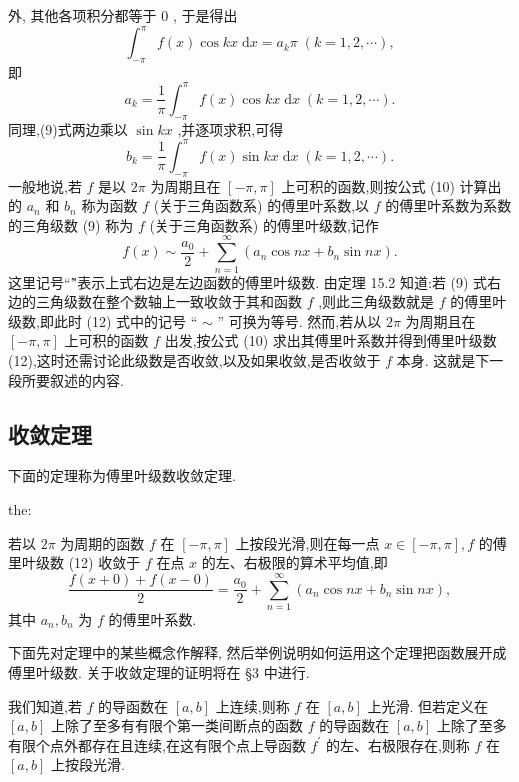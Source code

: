 外, 其他各项积分都等于 0 , 于是得出
\[
{\int }_{-\pi }^{\pi }f\left( x\right) \cos {kx}\mathrm{\;d}x = {a}_{k}\pi \;\left( {k = 1,2,\cdots }\right) ,
\]
即
\[
{a}_{k} = \frac{1}{\pi }{\int }_{-\pi }^{\pi }f\left( x\right) \cos {kx}\mathrm{\;d}x\;\left( {k = 1,2,\cdots }\right) .
\]
同理,(9)式两边乘以 \(\sin {kx}\) ,并逐项求积,可得
\[
{b}_{k} = \frac{1}{\pi }{\int }_{-\pi }^{\pi }f\left( x\right) \sin {kx}\mathrm{\;d}x\;\left( {k = 1,2,\cdots }\right) .
\]
一般地说,若 \(f\) 是以 \({2\pi }\) 为周期且在 \(\left\lbrack  {-\pi ,\pi }\right\rbrack\) 上可积的函数,则按公式 (10) 计算出的 \({a}_{n}\) 和 \({b}_{n}\) 称为函数 \(f\) (关于三角函数系) 的傅里叶系数,以 \(f\) 的傅里叶系数为系数的三角级数 (9) 称为 \(f\) (关于三角函数系) 的傅里叶级数,记作
\[
f\left( x\right)  \sim  \frac{{a}_{0}}{2} + \mathop{\sum }\limits_{{n = 1}}^{\infty }\left( {{a}_{n}\cos {nx} + {b}_{n}\sin {nx}}\right) . \tag{12}
\]
这里记号“\~”表示上式右边是左边函数的傅里叶级数. 由定理 15.2 知道:若 (9) 式右边的三角级数在整个数轴上一致收敛于其和函数 \(f\) ,则此三角级数就是 \(f\) 的傅里叶级数,即此时 (12) 式中的记号 “ \(\sim\) ” 可换为等号. 然而,若从以 \({2\pi }\) 为周期且在 \(\left\lbrack  {-\pi ,\pi }\right\rbrack\) 上可积的函数 \(f\) 出发,按公式 (10) 求出其傅里叶系数并得到傅里叶级数 (12),这时还需讨论此级数是否收敛,以及如果收敛,是否收敛于 \(f\) 本身. 这就是下一段所要叙述的内容.

\subsection{收敛定理}

下面的定理称为傅里叶级数收敛定理.

\begin{theorem}{}{the:}

\end{theorem}
 若以 \({2\pi }\) 为周期的函数 \(f\) 在 \(\left\lbrack  {-\pi ,\pi }\right\rbrack\) 上按段光滑,则在每一点 \(x \in  \left\lbrack  {-\pi ,\pi }\right\rbrack  ,f\) 的傅里叶级数 (12) 收敛于 \(f\) 在点 \(x\) 的左、右极限的算术平均值,即
\[
\frac{f\left( {x + 0}\right)  + f\left( {x - 0}\right) }{2} = \frac{{a}_{0}}{2} + \mathop{\sum }\limits_{{n = 1}}^{\infty }\left( {{a}_{n}\cos {nx} + {b}_{n}\sin {nx}}\right) ,
\]
其中 \({a}_{n},{b}_{n}\) 为 \(f\) 的傅里叶系数.

下面先对定理中的某些概念作解释, 然后举例说明如何运用这个定理把函数展开成傅里叶级数. 关于收敛定理的证明将在 §3 中进行.

我们知道,若 \(f\) 的导函数在 \(\left\lbrack  {a,b}\right\rbrack\) 上连续,则称 \(f\) 在 \(\left\lbrack  {a,b}\right\rbrack\) 上光滑. 但若定义在 \(\left\lbrack  {a,b}\right\rbrack\) 上除了至多有有限个第一类间断点的函数 \(f\) 的导函数在 \(\left\lbrack  {a,b}\right\rbrack\) 上除了至多有限个点外都存在且连续,在这有限个点上导函数 \({f}^{\prime }\) 的左、右极限存在,则称 \(f\) 在 \(\left\lbrack  {a,b}\right\rbrack\) 上按段光滑.

